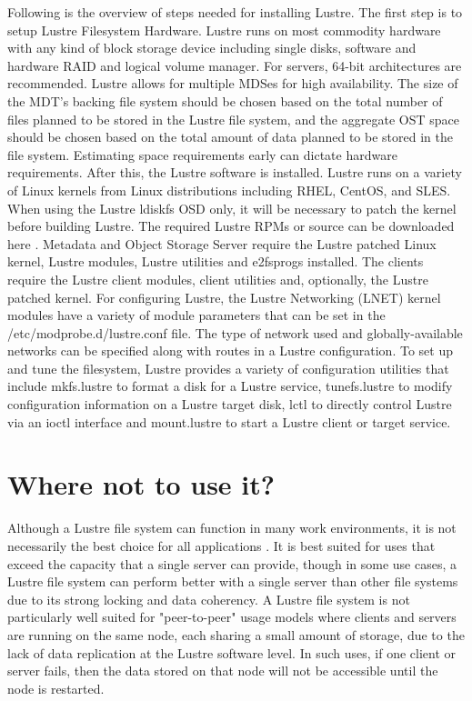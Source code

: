 \documentclass[9pt,twocolumn,twoside]{styles/osajnl}
\begin{document}
Following is the overview of steps needed for installing Lustre.  The
first step is to setup Lustre Filesystem Hardware. Lustre runs on most
commodity hardware with any kind of block storage device including
single disks, software and hardware RAID and logical volume
manager. For servers, 64-bit architectures are recommended. Lustre
allows for multiple MDSes for high availability. The size of the MDT’s
backing file system should be chosen based on the total number of
files planned to be stored in the Lustre file system, and the
aggregate OST space should be chosen based on the total amount of data
planned to be stored in the file system. Estimating space requirements
early can dictate hardware requirements. After this, the Lustre
software is installed. Lustre runs on a variety of Linux kernels from
Linux distributions including RHEL, CentOS, and SLES.  When using the
Lustre ldiskfs OSD only, it will be necessary to patch the kernel
before building Lustre. The required Lustre RPMs or source can be
downloaded here \cite{www-download}. Metadata and Object Storage
Server require the Lustre patched Linux kernel, Lustre modules, Lustre
utilities and e2fsprogs installed. The clients require the Lustre
client modules, client utilities and, optionally, the Lustre patched
kernel. For configuring Lustre, the Lustre Networking (LNET) kernel
modules have a variety of module parameters that can be set in the
/etc/modprobe.d/lustre.conf file. The type of network used and
globally-available networks can be specified along with routes in a
Lustre configuration. To set up and tune the filesystem, Lustre
provides a variety of configuration utilities that include mkfs.lustre
to format a disk for a Lustre service, tunefs.lustre to modify
configuration information on a Lustre target disk, lctl to directly
control Lustre via an ioctl interface and mount.lustre to start a
Lustre client or target service.

\section{Where not to use it?}

Although a Lustre file system can function in many work environments,
it is not necessarily the best choice for all applications
\cite{www-manual}. It is best suited for uses that exceed the capacity
that a single server can provide, though in some use cases, a Lustre
file system can perform better with a single server than other file
systems due to its strong locking and data coherency. A Lustre file
system is not particularly well suited for "peer-to-peer" usage models
where clients and servers are running on the same node, each sharing a
small amount of storage, due to the lack of data replication at the
Lustre software level. In such uses, if one client or server fails,
then the data stored on that node will not be accessible until the
node is restarted.
\end{document}

